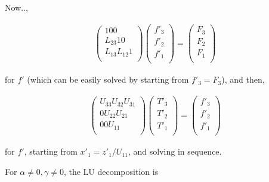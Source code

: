Now..,

\begin{eqnarray}
  \left( \begin{array}{lll}
         1       0       0      \\
         L_{23}  1       0      \\
         L_{13}  L_{12}  1      \\
         \end{array} \right)
  \left( \begin{array}{l}
         f'_3 \\ f'_2 \\ f'_1 \\
         \end{array} \right)
  =
  \left(  \begin{array}{l}
          F_3 \\ F_2 \\ F_1 \\
          \end{array} \right)
\end{eqnarray}

for \(f'\) (which can be easily solved by starting from \(f'_3=F_3\)),
and then,

\begin{eqnarray}
  \left( \begin{array}{lll}
         U_{33}  U_{32}  U_{31} \\
         0       U_{22}  U_{21} \\
         0       0       U_{11} \\
         \end{array} \right)
  \left( \begin{array}{l}
         T'_3 \\ T'_2 \\ T'_1 \\
         \end{array} \right)
  =
  \left(  \begin{array}{l}
          f'_3 \\ f'_2 \\ f'_1 \\
          \end{array} \right)
\end{eqnarray}

for \(f'\), starting from \(x'_1=z'_1/U_{11}\), and solving in sequence.

For \(\alpha \neq 0, \gamma \neq 0\), the LU decomposition is

